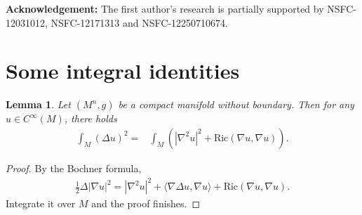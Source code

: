 \documentclass[11pt]{amsart}
\newtheorem{lemma}{Lemma}
\numberwithin{equation}{section}
\numberwithin{lemma}{section}
\numberwithin{proposition}{section}
\numberwithin{corollary}{section}
\numberwithin{remark}{section}
\begin{document}
\textbf{Acknowledgement:} The first author's research is partially supported by NSFC-12031012, NSFC-12171313 and NSFC-12250710674.
\section{Some integral identities}\label{sec. preliminaries}
\begin{lemma}\label{lem.laplace squared}
        Let $(M^n,g)$ be a compact manifold without boundary. Then for any $u\in C^{\infty}(M)$, there holds
        \begin{align*}
            \int_M(\Delta u)^2
            =&\int_M
            \left(\left|\nabla^2 u\right|^2
            +\mathrm{Ric}(\nabla u,\nabla u)\right).
        \end{align*}
    \end{lemma}
    \begin{proof}
 By the Bochner formula,
        \begin{align*}
            \frac{1}{2}\Delta |\nabla u|^2
            =\left|\nabla^2 u\right|^2
            +\langle\nabla \Delta u,\nabla u\rangle
            +\mathrm{Ric}(\nabla u,\nabla u).
        \end{align*}
        Integrate it over $M$ and the proof finishes.
    \end{proof}
\end{document}
